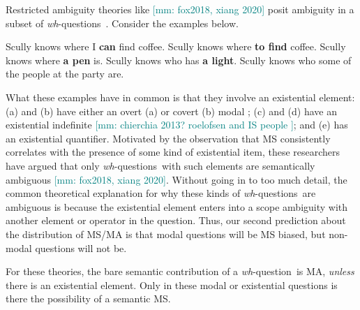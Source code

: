 \documentclass[12pt,letterpaper,table,svgnames,dvipsnames]{article}
\newcommand{\mm}[1]{\textcolor{teal}{[mm: #1]}}
\newcommand{\whq}{\emph{wh}-question~}
\newcommand{\whqs}{\emph{wh}-questions~}
\begin{document}
Restricted ambiguity theories like \mm{fox2018, xiang 2020} posit ambiguity in a subset of \whqs$\!$. Consider the examples below. 
\begin{exe}
\ex {} \label{exitentials}
    \begin{xlist}
        \ex Scully knows where I \textbf{can} find coffee.
        \ex Scully knows where \textbf{to find} coffee.
        \ex Scully knows where \textbf{a pen} is.
        \ex Scully knows who has \textbf{a light}.
        \ex Scully knows who some of the people at the party are.
    \end{xlist}
\end{exe}
What these examples have in common is that they involve an existential element: (a) and (b) have either an overt (a) or covert (b) modal \cite{bhatt1999,dayal2016,xiang2016,george2011,nicolae2014,fox2014}; (c) and (d) have an existential indefinite \cite{groenstok1982, groenstok1984,vanrooij2003,vanrooij2004} \mm{chierchia 2013? roelofsen and IS people }; and (e) has an existential quantifier. Motivated by the observation that MS consistently correlates with the presence of some kind of existential item, these researchers have argued that only \whqs with such elements are semantically ambiguous \cite[Ch:6]{nicolae2014,fox2014,xiang2016,george2011}\mm{fox2018, xiang 2020}. Without going in to too much detail, the common theoretical explanation for why these kinds of \whqs are ambiguous is because the existential element enters into a scope ambiguity with another element or operator in the question. Thus, our second prediction about the distribution of MS/MA is that modal questions will be MS biased, but non-modal questions will not be.

For these theories, the bare semantic contribution of a \whq is MA, \emph{unless} there is an existential element. Only in these modal or existential questions is there the possibility of a semantic MS.
\end{document}
